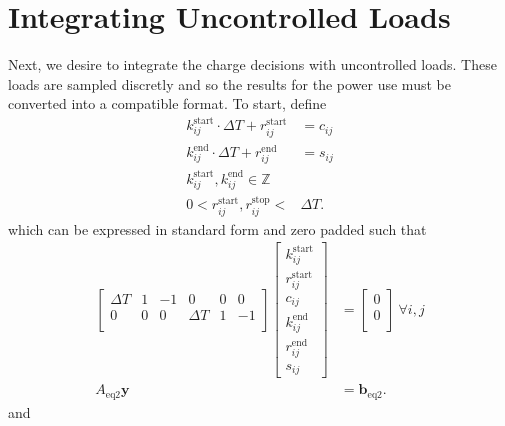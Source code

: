\section{Integrating Uncontrolled Loads}
Next, we desire to integrate the charge decisions with uncontrolled loads.  These loads are sampled discretly and so the results for the power use must be converted into a compatible format.  To start, define
\begin{equation} \begin{aligned}
		k^{\text{start}}_{ij}\cdot\Delta T + r^{\text{start}}_{ij}&= c_{ij} \\
		k^{\text{end}}_{ij}\cdot\Delta T + r^{\text{end}}_{ij}&= s_{ij} \\
	k^{\text{start}}_{ij}, k^{\text{end}}_{ij} \in \mathbb{Z} \\
	0 < r^{\text{start}}_{ij}, r^{\text{stop}}_{ij} < &\Delta T.
\end{aligned} \end{equation} 
which can be expressed in standard form and zero padded such that
\begin{equation} \begin{aligned}
	\begin{bmatrix}\Delta T &  1 & -1 & 0        & 0 &  0\\ 
		       0        &  0 & 0  & \Delta T & 1 & -1\\
	\end{bmatrix} 
	\begin{bmatrix} k_{ij}^{\text{start}} \\
		        r_{ij}^{\text{start}} \\
			c_{ij}                \\
			k_{ij}^{\text{end}}   \\
			r_{ij}^{\text{end}}   \\
			s_{ij}
	\end{bmatrix} &= 
	\begin{bmatrix} 0 \\
	                0 \\
	\end{bmatrix} \ \forall i,j \\ 
	A_{\text{eq2}}\mathbf{y} &= \mathbf{b}_{\text{eq2}}.
\end{aligned} \end{equation}
and 
